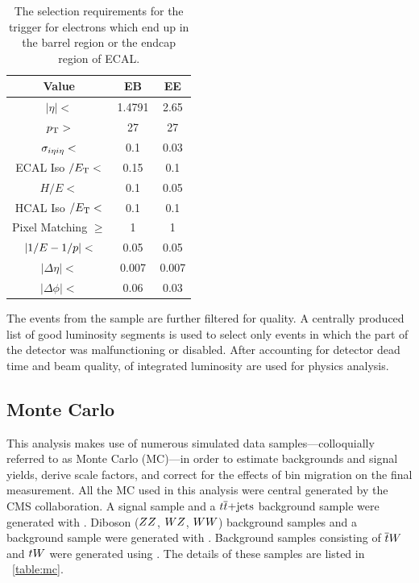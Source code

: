 \begin{table}[h]
\centering
\begin{center}
    \begin{tabular}{ | c | c c |} \hline
        Value                      & EB     & EE     \\ \hline
        $|\eta| <$                 & 1.4791 & 2.65   \\
        $p_{\mathrm{T}} >$                    & 27     & 27     \\
        $\sigma_{i \eta i \eta} <$         & 0.1    & 0.03   \\
        ECAL Iso $/ E_{\mathrm{T}} <$         & 0.15   & 0.1    \\
        $H/E <$                    & 0.1    & 0.05   \\
        HCAL Iso $/ E_{\mathrm{T}} <$         & 0.1    & 0.1    \\
        Pixel Matching $\ge$       & 1      & 1      \\
        $|1/E - 1/p| <$              & 0.05   & 0.05   \\
        $|\Delta \eta| <$          & 0.007  & 0.007  \\
        $|\Delta \phi| <$          & 0.06   & 0.03   \\ \hline
    \end{tabular}
\end{center}
\caption{
    The selection requirements for the \SingleElectronTrigger trigger for
    electrons which end up in the barrel region or the endcap region of ECAL.
}
\label{table:wp80}
\end{table}


The events from the \SingleElectron sample are further filtered for quality. A
centrally produced list of good luminosity segments is used to select only
events in which the part of the detector was malfunctioning or disabled. After
accounting for detector dead time and beam quality, \GoodLumiNumber of
integrated luminosity are used for physics analysis.

\subsection{Monte Carlo}

This analysis makes use of numerous simulated data samples---colloquially
referred to as Monte Carlo (MC)---in order to estimate backgrounds and signal
yields, derive scale factors, and correct for the effects of bin migration on
the final measurement. All the MC used in this analysis were central generated
by the CMS collaboration. A \DYtoll signal sample and a $t\overline{t}\text{+jets}$
background sample were generated with \MADGRAPH \cite{alwall2014}. Diboson
($ZZ$, $WZ$, $WW$) background samples and a \DYtotautau background sample
were generated with \PYTHIA \cite{sjostran2006}. Background samples consisting
of $\overline{t} W$ and $t W$ were generated using \POWHEG
\cite{nason2004}\cite{alioli2010}\cite{re2011}. The details of these samples
are listed in \TAB~\ref{table:mc}.

